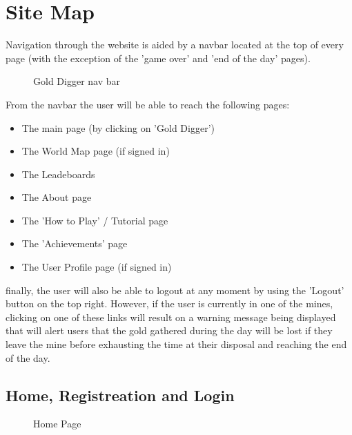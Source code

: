 \documentclass{mproj}
\begin{document}
\section{Site Map}

Navigation through the website is aided by a navbar located at the top of every page (with the exception of the 'game over' and 'end of the day'
pages). 
\begin{figure} [h] 
	\centering
	\caption{Gold Digger nav bar}
           \label{navbar}
\end{figure}

From the navbar the user will be able to reach the following pages:

\begin{itemize}
  	\item The main page (by clicking on 'Gold Digger')
  	\item The World Map page (if signed in)
	\item The Leadeboards
	\item The About page
	\item The 'How to Play' / Tutorial page
	\item The 'Achievements' page
  	\item The User Profile page (if signed in)
\end{itemize} 

finally, the user will also be able to logout at any moment by using the 'Logout' button on the top right. However, if the user is currently in one of the mines,
clicking on one of these links will result on a warning message being displayed that will alert users that the gold gathered during the day will be lost if they leave
the mine before exhausting the time at their disposal and reaching the end of the day. 

\subsection{Home, Registreation and Login}


\begin{figure} [h] 
	\centering
	\caption{Home Page}
           \label{homepage}
\end{figure}
\end{document}
